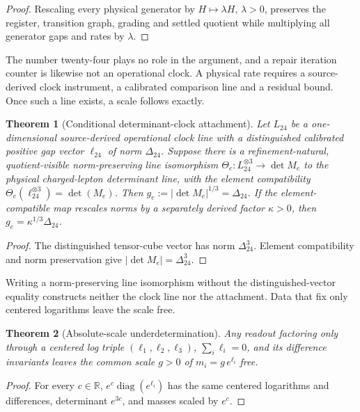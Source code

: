 \documentclass[11pt]{article}
\newtheorem{theorem}{Theorem}[section]
\begin{document}
\begin{proof}
Rescaling every physical generator by \(H\mapsto\lambda H\), \(\lambda>0\),
preserves the register, transition graph, grading and settled quotient while
multiplying all generator gaps and rates by \(\lambda\).
\end{proof}

The number twenty-four plays no role in the argument, and a repair
iteration counter is likewise not an operational clock. A physical rate
requires a source-derived clock instrument, a calibrated comparison line and
a residual bound. Once such a line exists, a scale follows exactly.

\begin{theorem}[Conditional determinant-clock attachment]
Let \(L_{24}\) be a one-dimensional source-derived operational clock line
with a distinguished calibrated positive gap vector \(\ell_{24}\) of norm
\(\Delta_{24}\). Suppose there is a refinement-natural, quotient-visible
norm-preserving line isomorphism
\(\Theta_e:L_{24}^{\otimes3}\to\det M_e\) to the physical charged-lepton
determinant line, with the element compatibility
\(\Theta_e(\ell_{24}^{\otimes3})=\det(M_e)\). Then
\(g_e:=|\det M_e|^{1/3}=\Delta_{24}\). If the element-compatible map
rescales norms by a separately derived factor \(\kappa>0\), then
\(g_e=\kappa^{1/3}\Delta_{24}\).
\end{theorem}

\begin{proof}
The distinguished tensor-cube vector has norm \(\Delta_{24}^3\). Element
compatibility and norm preservation give \(|\det M_e|=\Delta_{24}^3\).
\end{proof}

Writing a norm-preserving line isomorphism without the distinguished-vector
equality constructs neither the clock line nor the attachment. Data that
fix only centered logarithms leave the scale free.

\begin{theorem}[Absolute-scale underdetermination]
Any readout factoring only through a centered log triple
\((\ell_1,\ell_2,\ell_3)\), \(\sum_i\ell_i=0\), and its difference invariants
leaves the common scale \(g>0\) of \(m_i=g\,e^{\ell_i}\) free.
\end{theorem}

\begin{proof}
For every \(c\in\mathbb R\), \(e^c\operatorname{diag}(e^{\ell_i})\) has the
same centered logarithms and differences, determinant \(e^{3c}\), and masses
scaled by \(e^c\).
\end{proof}
\end{document}
